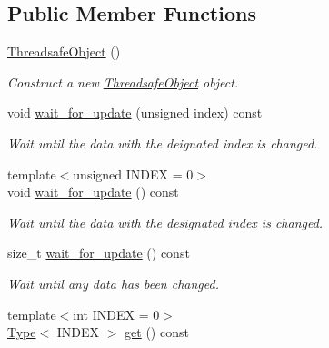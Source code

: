 \subsection*{Public Member Functions}
\begin{DoxyCompactItemize}
\item 
\hyperlink{classreal__time__tools_1_1ThreadsafeObject_a4b1b5185f60ed5228e307c10639dfe63}{Threadsafe\+Object} ()\hypertarget{classreal__time__tools_1_1ThreadsafeObject_a4b1b5185f60ed5228e307c10639dfe63}{}\label{classreal__time__tools_1_1ThreadsafeObject_a4b1b5185f60ed5228e307c10639dfe63}

\begin{DoxyCompactList}\small\item\em Construct a new \hyperlink{classreal__time__tools_1_1ThreadsafeObject}{Threadsafe\+Object} object. \end{DoxyCompactList}\item 
void \hyperlink{classreal__time__tools_1_1ThreadsafeObject_a83fbbd7ec1e88f3e58d9644c561d10d4}{wait\+\_\+for\+\_\+update} (unsigned index) const 
\begin{DoxyCompactList}\small\item\em Wait until the data with the deignated index is changed. \end{DoxyCompactList}\item 
{\footnotesize template$<$unsigned I\+N\+D\+EX = 0$>$ }\\void \hyperlink{classreal__time__tools_1_1ThreadsafeObject_aa072c55b6b539550a53d21f60464d058}{wait\+\_\+for\+\_\+update} () const 
\begin{DoxyCompactList}\small\item\em Wait until the data with the designated index is changed. \end{DoxyCompactList}\item 
size\+\_\+t \hyperlink{classreal__time__tools_1_1ThreadsafeObject_add7d192b535970c0b27371e505a2ff96}{wait\+\_\+for\+\_\+update} () const 
\begin{DoxyCompactList}\small\item\em Wait until any data has been changed. \end{DoxyCompactList}\item 
{\footnotesize template$<$int I\+N\+D\+EX = 0$>$ }\\\hyperlink{classreal__time__tools_1_1ThreadsafeObject_aa40f755aebba0692a345e2b807d781ed}{Type}$<$ I\+N\+D\+EX $>$ \hyperlink{classreal__time__tools_1_1ThreadsafeObject_ad04e1268e2988a199e785dca817b937a}{get} () const 

\end{DoxyCompactItemize}
